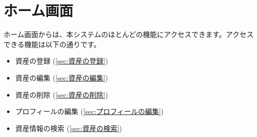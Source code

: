 \documentclass[11ptm]{jsarticle}
\begin{document}
\clearpage
\section{ホーム画面}
\label{sec:ホーム画面}
ホーム画面からは、本システムのほとんどの機能にアクセスできます。アクセスできる機能は以下の通りです。
\begin{itemize}
  \item 資産の登録 (\!\ref{sec:資産の登録})
  \item 資産の編集 (\!\ref{sec:資産の編集})
  \item 資産の削除 (\!\ref{sec:資産の削除})
  \item プロフィールの編集 (\!\ref{sec:プロフィールの編集})
  \item 資産情報の検索 (\!\ref{sec:資産の検索})
\end{itemize}
\end{document}
